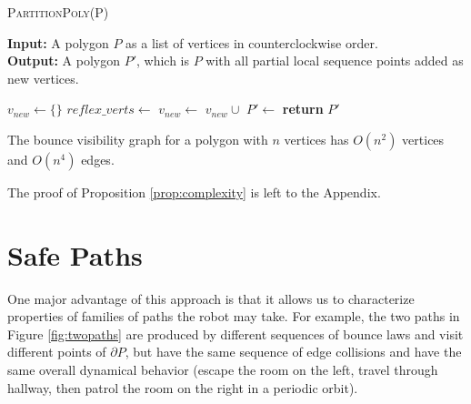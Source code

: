 \documentclass[]{styles/svproc}  %
\begin{document}
\begin{algorithm}
\caption{\textsc{PartitionPoly}(P)}
\label{algo:insert}
\hspace*{\algorithmicindent} \textbf{Input:} A polygon $P$ as a list of
vertices in counterclockwise order.\\
\hspace*{\algorithmicindent} \textbf{Output:} A polygon $P'$, which is $P$ with
all partial local sequence points added as new vertices.
\begin{algorithmic}[1]
\State $v_{new} \gets \{\}$
\State $reflex\_verts \gets$ 
        \State $v_{new} \gets$ $v_{new} \cup$ 
    \EndFor
\EndFor
\State $P' \gets$ 
\State \textbf{return} $P'$
\end{algorithmic}
\end{algorithm}

\begin{proposition} \label{prop:complexity}
The bounce visibility graph for a polygon with $n$ vertices has 
$O(n^2)$ vertices and $O(n^4)$ edges.
\end{proposition}

The proof of Proposition \ref{prop:complexity} is left to the Appendix.

%
%

\section{Safe Paths} \label{sec:safe}

One major advantage of this approach is that it allows us to characterize
properties of families of paths the robot may take. For example, the  
two paths in Figure \ref{fig:twopaths} are produced by different sequences of
bounce laws and visit different points of $\partial P$, but have the same sequence of edge collisions and have the same overall
dynamical behavior (escape the room on the left, travel through hallway, then
patrol the room on the right in a periodic orbit).
\end{document}

